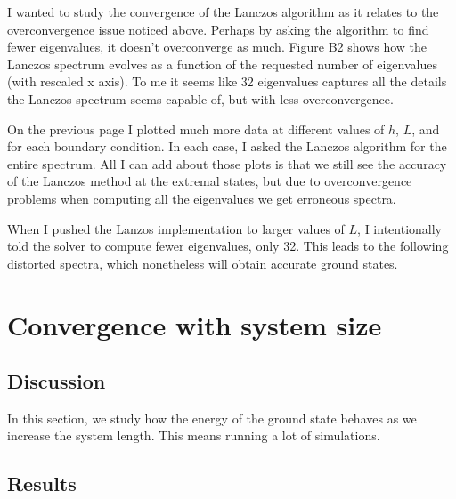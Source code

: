 \documentclass{article}
\begin{document}
{\centering



}

I wanted to study the convergence of the Lanczos algorithm
as it relates to the overconvergence issue noticed above.
Perhaps by asking the algorithm to find fewer eigenvalues,
it doesn't overconverge as much.
Figure B2 shows how the Lanczos spectrum evolves as a function
of the requested number of eigenvalues (with rescaled x axis).
To me it seems like 32 eigenvalues captures all the details
the Lanczos spectrum seems capable of, but with less overconvergence.

{\centering





}

On the previous page I plotted much more data at different 
values of $h$, $L$, and for each boundary condition.
In each case, I asked the Lanczos algorithm for the
entire spectrum.
All I can add about those plots is that we still see
the accuracy of the Lanczos method at the extremal states,
but due to overconvergence problems when computing all the
eigenvalues we get erroneous spectra.

When I pushed the Lanzos implementation to larger values of $L$, I intentionally
told the solver to compute fewer eigenvalues, only 32.
This leads to the following distorted spectra,
which nonetheless will obtain accurate ground states.


{\centering



}

\newpage

\section{
Convergence with system size
}

\subsection{
Discussion
}

In this section, we study how the energy of the ground
state behaves as we increase the system length.
This means running a lot of simulations.

\subsection{
Results
}
\end{document}
